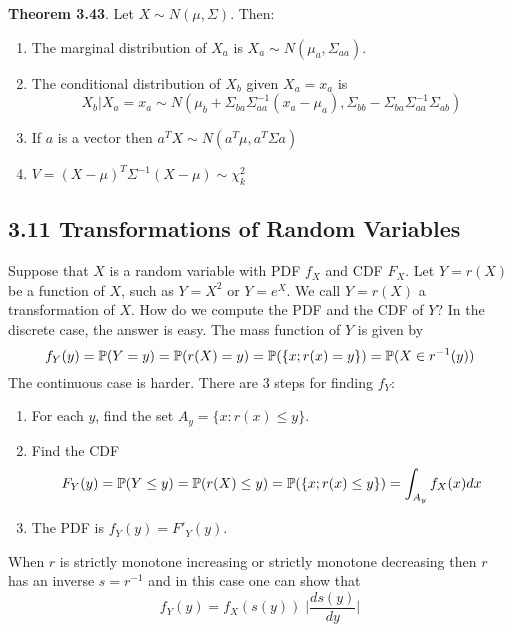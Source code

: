 \textbf{Theorem 3.43}. Let \(X \sim N(\mu, \Sigma)\). Then:
\begin{enumerate}[label={\arabic*.}]
\item
  The marginal distribution of \(X_a\) is
  \(X_a \sim N(\mu_a, \Sigma_{aa})\).
\item
  The conditional distribution of \(X_b\) given \(X_a = x_a\) is
  \[
 X_b | X_a = x_a \sim N \left( \mu_b + \Sigma_{ba}\Sigma_{aa}^{-1}(x_a - \mu_a), \Sigma_{bb} - \Sigma_{ba} \Sigma_{aa}^{-1} \Sigma_{ab} \right)
\]
\item
  If \(a\) is a vector then \(a^T X \sim N(a^T \mu, a^T \Sigma a)\)
\item
  \(V = (X - \mu)^T \Sigma^{-1} (X - \mu) \sim \chi_{k}^{2}\)
\end{enumerate}

\subsection*{3.11 Transformations of Random
Variables}\label{transformations-of-random-variables}
Suppose that \(X\) is a random variable with PDF \(f_X\) and CDF
\(F_X\). Let \(Y = r(X)\) be a function of \(X\), such as \(Y = X^{2}\) or
\(Y = e^X\). We call \(Y = r(X)\) a transformation of \(X\). How do we
compute the PDF and the CDF of \(Y\)? In the discrete case, the answer
is easy. The mass function of \(Y\) is given by
\[
f_Y(y) = \operatorname{\mathbb{P}}(Y = y) = \operatorname{\mathbb{P}}(r(X) = y) = \operatorname{\mathbb{P}}(\{x; r(x) = y\}) = \operatorname{\mathbb{P}}(X \in r^{-1}(y))
\]
The continuous case is harder. There are 3 steps for finding \(f_Y\):
\begin{enumerate}[label={\arabic*.}]
\item
  For each \(y\), find the set \(A_y = \{ x : r(x) \leq y \}\).
\item
  Find the CDF
  \[
F_Y(y) = \operatorname{\mathbb{P}}(Y \leq y) = \operatorname{\mathbb{P}}(r(X) \leq y) = \operatorname{\mathbb{P}}(\{x ; r(x) \leq y \}) = \int_{A_y} f_X(x) dx
\]
\item
  The PDF is \(f_Y(y) = F'_Y(y)\).
\end{enumerate}
When \(r\) is strictly monotone increasing or strictly monotone
decreasing then \(r\) has an inverse \(s = r^{-1}\) and in this case one
can show that
\[
f_Y(y) = f_X(s(y)) \;\Bigg| \frac{ds(y)}{dy} \Bigg|
\]

